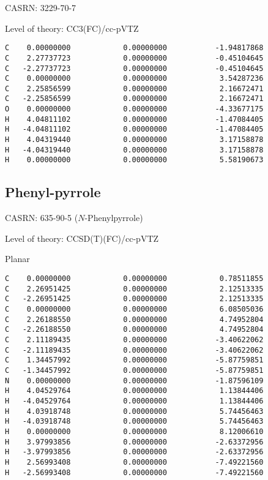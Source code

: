 \documentclass[journal=jctcce,manuscript=article,layout=traditional]{achemso}
\newcommand{\TZ}{cc-pVTZ}
\begin{document}
CASRN: 3229-70-7

\begin{singlespace}
\noindent Level of theory: CC3(FC)/{\TZ}
\begin{verbatim}
C    0.00000000            0.00000000           -1.94817868
C    2.27737723            0.00000000           -0.45104645
C   -2.27737723            0.00000000           -0.45104645
C    0.00000000            0.00000000            3.54287236
C    2.25856599            0.00000000            2.16672471
C   -2.25856599            0.00000000            2.16672471
O    0.00000000            0.00000000           -4.33677175
H    4.04811102            0.00000000           -1.47084405
H   -4.04811102            0.00000000           -1.47084405
H    4.04319440            0.00000000            3.17158878
H   -4.04319440            0.00000000            3.17158878
H    0.00000000            0.00000000            5.58190673
\end{verbatim}
\end{singlespace}

\subsection{Phenyl-pyrrole}

CASRN: 635-90-5  ($N$-Phenylpyrrole)

\begin{singlespace}
\noindent Level of theory: CCSD(T)(FC)/{\TZ}
\end{singlespace}

\begin{singlespace}
\noindent Planar
\begin{verbatim}
C    0.00000000            0.00000000            0.78511855
C    2.26951425            0.00000000            2.12513335
C   -2.26951425            0.00000000            2.12513335
C    0.00000000            0.00000000            6.08505036
C    2.26188550            0.00000000            4.74952804
C   -2.26188550            0.00000000            4.74952804
C    2.11189435            0.00000000           -3.40622062
C   -2.11189435            0.00000000           -3.40622062
C    1.34457992            0.00000000           -5.87759851
C   -1.34457992            0.00000000           -5.87759851
N    0.00000000            0.00000000           -1.87596109
H    4.04529764            0.00000000            1.13844406
H   -4.04529764            0.00000000            1.13844406
H    4.03918748            0.00000000            5.74456463
H   -4.03918748            0.00000000            5.74456463
H    0.00000000            0.00000000            8.12006610
H    3.97993856            0.00000000           -2.63372956
H   -3.97993856            0.00000000           -2.63372956
H    2.56993408            0.00000000           -7.49221560
H   -2.56993408            0.00000000           -7.49221560
\end{verbatim}
\end{singlespace}
\end{document}
